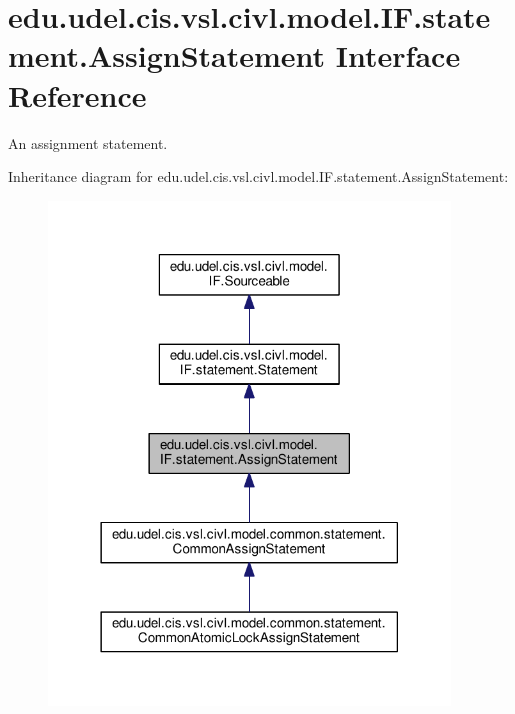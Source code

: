 \hypertarget{interfaceedu_1_1udel_1_1cis_1_1vsl_1_1civl_1_1model_1_1IF_1_1statement_1_1AssignStatement}{}\section{edu.\+udel.\+cis.\+vsl.\+civl.\+model.\+I\+F.\+statement.\+Assign\+Statement Interface Reference}
\label{interfaceedu_1_1udel_1_1cis_1_1vsl_1_1civl_1_1model_1_1IF_1_1statement_1_1AssignStatement}


An assignment statement.  




Inheritance diagram for edu.\+udel.\+cis.\+vsl.\+civl.\+model.\+I\+F.\+statement.\+Assign\+Statement\+:
\nopagebreak
\begin{figure}[H]
\begin{center}
\leavevmode
\includegraphics[width=302pt]{interfaceedu_1_1udel_1_1cis_1_1vsl_1_1civl_1_1model_1_1IF_1_1statement_1_1AssignStatement__inherit__graph}
\end{center}
\end{figure}


